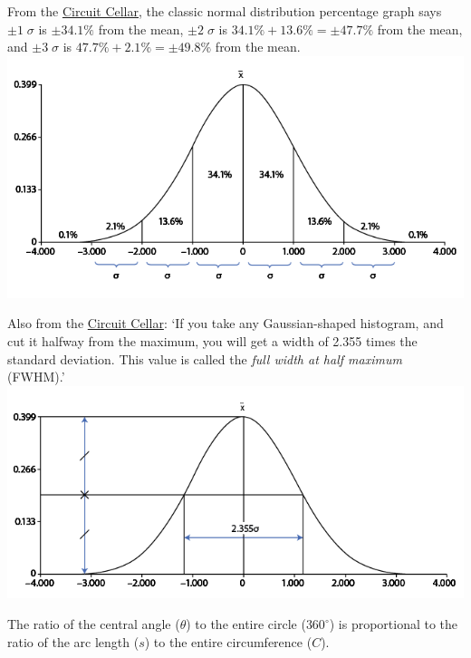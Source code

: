 \documentclass[11pt]{article}%
\begin{document}
\begin{multicols*}{2}
From the \href{https://circuitcellar.com/research-design-hub/basics-of-design/making-heads-or-tails-of-rms-measurements/}{Circuit Cellar}, the classic normal distribution percentage graph says $\pm 1\;\sigma$ is $\boxed{\pm 34.1\%}$ from the mean, $\pm 2\;\sigma$ is $34.1\% + \boxed{13.6\%} = \pm 47.7\%$ from the mean, and $\pm 3\;\sigma$ is $47.7\% + \boxed{2.1\%} = \pm 49.8\%$ from the mean.
\includegraphics[width=\columnwidth]{./cc-std-dev-percent.png}

Also from the \href{https://circuitcellar.com/research-design-hub/basics-of-design/making-heads-or-tails-of-rms-measurements/}{Circuit Cellar}: `If you take any Gaussian-shaped histogram, and cut it halfway from the maximum, you will get a width of 2.355 times the standard deviation. This value is called the \textit{full width at half maximum} (FWHM).'
\includegraphics[width=\columnwidth]{./cc-fwhm.png}

\divider

The ratio of the central angle ($\theta$) to the entire circle ($360^{\circ}$) is proportional to the ratio of the arc length ($s$) to the entire circumference ($C$).


\end{multicols*}
\end{document}
